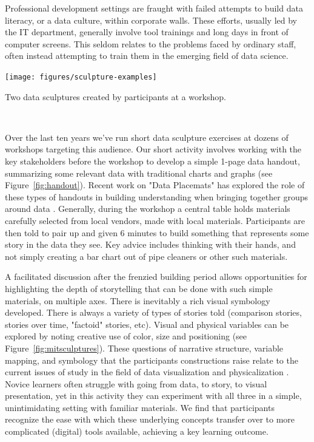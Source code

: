 \documentclass{sigchi-ext}
\begin{document}
Professional development settings are fraught with failed attempts to build data literacy, or a data culture, within corporate walls.  These efforts, usually led by the IT department, generally involve tool trainings and long days in front of computer screens.  This seldom relates to the problems faced by ordinary staff, often instead attempting to train them in the emerging field of data science.


\begin{marginfigure}[-5pc]
  \begin{minipage}{\marginparwidth}
    \centering
    \texttt{[image: figures/sculpture-examples]}
    \caption{Two data sculptures created by participants at a workshop.}~\label{fig:mitsculptures}
  \end{minipage}
\end{marginfigure}

Over the last ten years we've run short data sculpture exercises at dozens of workshops targeting this audience.  Our short activity involves working with the key stakeholders before the workshop to develop a simple 1-page data handout, summarizing some relevant data with traditional charts and graphs (see Figure~\ref{fig:handout}).  Recent work on "Data Placemats" has explored the role of these types of handouts in building understanding when bringing together groups around data \cite{Pankaj_Emery_2016}.  Generally, during the workshop a central table holds materials carefully selected from local vendors, made with local materials.  Participants are then told to pair up and given 6 minutes to build something that represents some story in the data they see.  Key advice includes thinking with their hands, and not simply creating a bar chart out of pipe cleaners or other such materials.

A facilitated discussion after the frenzied building period allows opportunities for highlighting the depth of storytelling that can be done with such simple materials, on multiple axes.  There is inevitably a rich visual symbology developed.  There is always a variety of types of stories told (comparison stories, stories over time, "factoid" stories, etc).  Visual and physical variables can be explored by noting creative use of color, size and positioning (see Figure~\ref{fig:mitsculptures}). These questions of narrative structure, variable mapping, and symbology that the participants constructions raise relate to the current issues of study in the field of data visualization and physicalization \cite{Jansen_2015}.  Novice learners often struggle with going from data, to story, to visual presentation, yet in this activity they can experiment with all three in a simple, unintimidating setting with familiar materials.  We find that participants recognize the ease with which these underlying concepts transfer over to more complicated (digital) tools available, achieving a key learning outcome.
\end{document}
